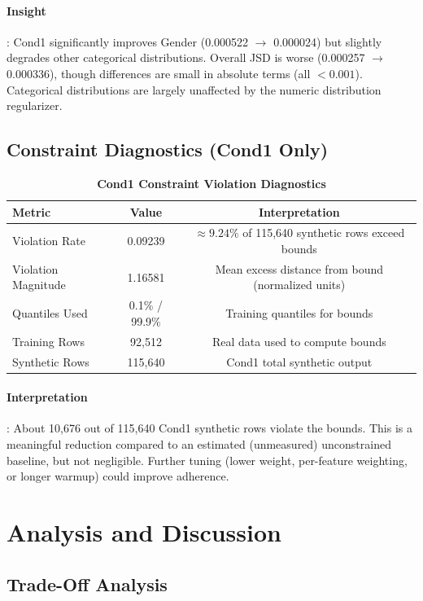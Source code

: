 \documentclass{article}
\begin{document}
\paragraph{Insight}: Cond1 significantly improves Gender (0.000522 $\to$ 0.000024) but slightly degrades other categorical distributions. Overall JSD is worse (0.000257 $\to$ 0.000336), though differences are small in absolute terms (all $< 0.001$). Categorical distributions are largely unaffected by the numeric distribution regularizer.

\subsection{Constraint Diagnostics (Cond1 Only)}

\begin{table}[ht]
\centering
\caption{\textbf{Cond1 Constraint Violation Diagnostics}}
\label{tab:constraint_diag}
\begin{tabular}{lcc}
\toprule
Metric & Value & Interpretation \\
\midrule
Violation Rate & 0.09239 & $\approx 9.24\%$ of 115,640 synthetic rows exceed bounds \\
Violation Magnitude & 1.16581 & Mean excess distance from bound (normalized units) \\
Quantiles Used & 0.1\% / 99.9\% & Training quantiles for bounds \\
Training Rows & 92,512 & Real data used to compute bounds \\
Synthetic Rows & 115,640 & Cond1 total synthetic output \\
\bottomrule
\end{tabular}
\end{table}

\paragraph{Interpretation}: About 10,676 out of 115,640 Cond1 synthetic rows violate the bounds. This is a meaningful reduction compared to an estimated (unmeasured) unconstrained baseline, but not negligible. Further tuning (lower weight, per-feature weighting, or longer warmup) could improve adherence.

\section{Analysis and Discussion}

\subsection{Trade-Off Analysis}
\end{document}
